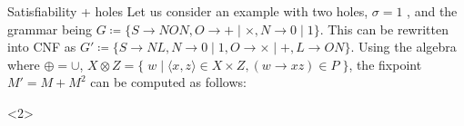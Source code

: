 \documentclass{beamer}
\newcommand{\hole}{\underline{\hspace{0.25cm}}}
\begin{document}
\begin{frame}[t,fragile]{Satisfiability + holes}
  Let us consider an example with two holes, $\sigma = 1$ \hole\phantom{.}\hole, and the grammar being $G\coloneqq\{S\rightarrow N O N, O \rightarrow + \mid \times, N \rightarrow 0 \mid 1\}$. This can be rewritten into CNF as $G'\coloneqq \{S \rightarrow N L, N \rightarrow 0 \mid 1, O \rightarrow \times \mid +, L \rightarrow O N\}$. Using the algebra where $\oplus=\cup$, $X \otimes Z = \big\{\;w \mid \langle x, z\rangle \in X \times Z, (w\rightarrow xz) \in P\;\big\}$, the fixpoint $M' = M + M^2$ can be computed as follows:\\\vspace{0.05cm}
  \begin{onlyenv}<2>
\end{onlyenv}

\end{frame}
\end{document}
